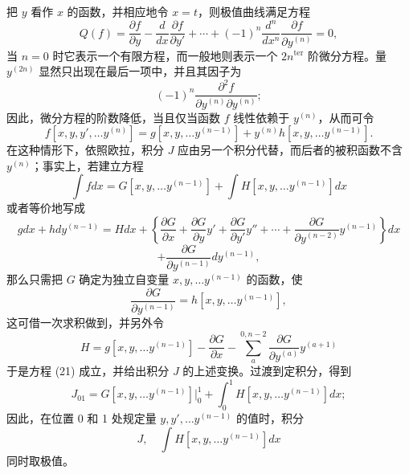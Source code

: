 \documentclass[11pt,a4paper,leqno]{article}
\begin{document}
把 $y$ 看作 $x$ 的函数，并相应地令 $x=t$，则极值曲线满足方程
\begin{equation}\tag{20}
Q(f)=\frac{\partial f}{\partial y}-\frac{d}{dx}\frac{\partial f}{\partial y'}+\cdots+(-1)^n\frac{d^n}{dx^n}\frac{\partial f}{\partial y^{(n)}}=0,
\end{equation}
当 $n=0$ 时它表示一个有限方程，而一般地则表示一个 $2n^{\mathrm{ter}}$ 阶微分方程。量 $y^{(2n)}$ 显然只出现在最后一项中，并且其因子为
\[
(-1)^n\frac{\partial^2f}{\partial y^{(n)}\partial y^{(n)}};
\]
因此，微分方程的阶数降低，当且仅当函数 $f$ 线性依赖于 $y^{(n)}$，从而可令
\[
f[x,y,y',\ldots y^{(n)}]=g[x,y,\ldots y^{(n-1)}]+y^{(n)}h[x,y,\ldots y^{(n-1)}].
\]
在这种情形下，依照欧拉，积分 $J$ 应由另一个积分代替，而后者的被积函数不含 $y^{(n)}$；事实上，若建立方程
\begin{equation}\tag{21}
\int fdx=G[x,y,\ldots y^{(n-1)}]+\int H[x,y,\ldots y^{(n-1)}]dx
\end{equation}
或者等价地写成
\[
gdx+hdy^{(n-1)}=Hdx
+\left\{\frac{\partial G}{\partial x}+\frac{\partial G}{\partial y}y'+\frac{\partial G}{\partial y'}y''+\cdots+\frac{\partial G}{\partial y^{(n-2)}}y^{(n-1)}\right\}dx
\]
\[
+\frac{\partial G}{\partial y^{(n-1)}}dy^{(n-1)},
\]
那么只需把 $G$ 确定为独立自变量 $x,y,\ldots y^{(n-1)}$ 的函数，使
\[
\frac{\partial G}{\partial y^{(n-1)}}=h[x,y,\ldots y^{(n-1)}],
\]
这可借一次求积做到，并另外令
\[
H=g[x,y,\ldots y^{(n-1)}]-\frac{\partial G}{\partial x}-\sum_a^{0,n-2}\frac{\partial G}{\partial y^{(a)}}y^{(a+1)}
\]
于是方程 (21) 成立，并给出积分 $J$ 的上述变换。过渡到定积分，得到
\[
J_{01}=G[x,y,\ldots y^{(n-1)}]\bigg|_0^1+
\int_0^1H[x,y,\ldots y^{(n-1)}]dx;
\]
因此，在位置 0 和 1 处规定量 $y,y',\ldots y^{(n-1)}$ 的值时，积分
\[
J,\quad \int H[x,y,\ldots y^{(n-1)}]dx
\]
同时取极值。
\end{document}
